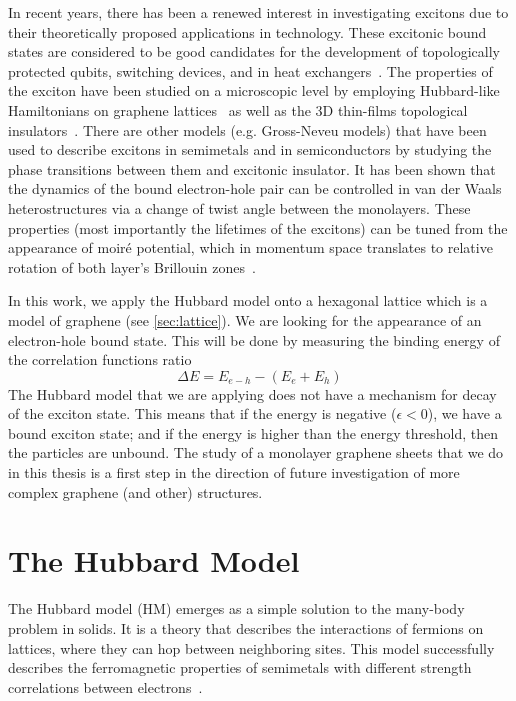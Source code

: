 In recent years, there has been a renewed interest in investigating excitons due to their theoretically proposed applications in technology. These excitonic bound states are considered to be good candidates for the development of topologically protected qubits, switching devices, and in heat exchangers~\cite{graphapl1, graphapl2, graphapl3}. The properties of the exciton have been studied on a microscopic level by employing Hubbard-like Hamiltonians on graphene lattices~\cite{graphene1, graphene2} as well as the 3D thin-films topological insulators~\cite{graphene3, graphene4, graphene5}. There are other models (e.g. Gross-Neveu models) that have been used to describe excitons in semimetals and in semiconductors by studying the phase transitions between them and excitonic insulator. It has been shown that the dynamics of the bound electron-hole pair can be controlled in van der Waals heterostructures via a change of twist angle between the monolayers. These properties (most importantly the lifetimes of the excitons) can be tuned from the appearance of moiré potential, which in momentum space translates to relative rotation of both layer's Brillouin zones~\cite{twistangle}.

In this work, we apply the Hubbard model onto a hexagonal lattice which is a model of graphene (see \cref{sec:lattice}). We are looking for the appearance of an electron-hole bound state. This will be done by measuring the binding energy of the correlation functions ratio
\begin{equation}
    \Delta E = E_{e-h} - (E_e + E_h)
    \label{eq:binding_energy}
\end{equation}
The Hubbard model that we are applying does not have a mechanism for decay of the exciton state. This means that if the energy is negative ($\epsilon < 0$), we have a bound exciton state; and if the energy is higher than the energy threshold, then the particles are unbound. The study of a monolayer graphene sheets that we do in this thesis is a first step in the direction of future investigation of more complex graphene (and other) structures.

\section{The Hubbard Model}

The Hubbard model (HM) emerges as a simple solution to the many-body problem in solids. It is a theory that describes the interactions of fermions on lattices, where they can hop between neighboring sites. This model successfully describes the ferromagnetic properties of semimetals with different strength correlations between electrons~\cite{hubex1, hubex2}. %

